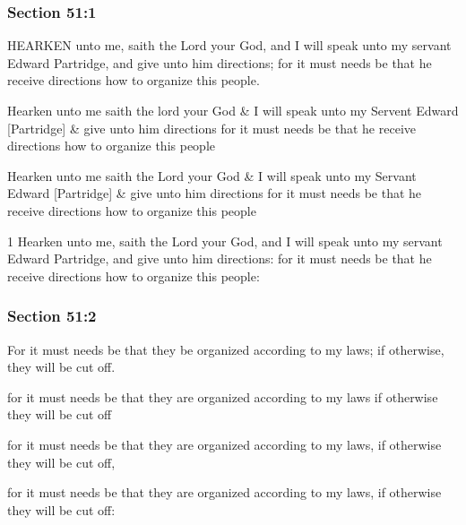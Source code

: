 	\subsubsection{Section 51:1} %
		\label{DC51-1}

		HEARKEN unto me, saith the Lord your God, and I will speak unto my servant Edward Partridge, and give unto him directions; for it must needs be that he receive directions how to organize this people.

		\begin{framed}
		\scriptsize
			\begin{compactdesc}
				\item[JSP] Hearken unto me saith the lord your God \& I will speak unto my Servent Edward [Partridge] \& give unto him directions for it must needs be that he receive directions how to organize this people
				\item[Gilbert] Hearken unto me saith the Lord your God \& I will speak unto my Servant Edward [Partridge] \& give unto him directions for it must needs be that he receive directions how to organize this people
				\item[DC 1835] 1 Hearken unto me, saith the Lord your God, and I will speak unto my servant Edward Partridge, and give unto him directions: for it must needs be that he receive directions how to organize this people:
			\end{compactdesc}
		\end{framed}

	\subsubsection{Section 51:2} %
		\label{DC51-2}

		For it must needs be that they be organized according to my laws; if otherwise, they will be cut off.

		\begin{framed}
		\scriptsize
			\begin{compactdesc}
				\item[JSP] for it must needs be that they are organized according to my laws if otherwise they will be cut off
				\item[Gilbert] for it must needs be that they are organized according to my laws, if otherwise they will be cut off,
				\item[DC 1835] for it must needs be that they are organized according to my laws, if otherwise they will be cut off:
			\end{compactdesc}
		\end{framed}

